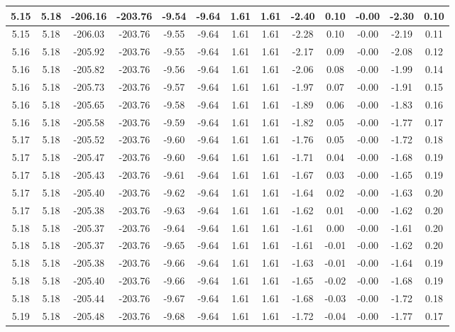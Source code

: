 \begin{table}[htbp]
\begin{adjustbox}{angle=90}
\begin{tabular}{|c|c|c|c|c|c|c|c|c|c|c|c|c|}
 5.15 & 5.18 & -206.16 & -203.76 & -9.54 & -9.64 & 1.61 & 1.61 & -2.40 & 0.10 & -0.00 & -2.30 & 0.10\\ \hline
 5.15 & 5.18 & -206.03 & -203.76 & -9.55 & -9.64 & 1.61 & 1.61 & -2.28 & 0.10 & -0.00 & -2.19 & 0.11\\ \hline
 5.16 & 5.18 & -205.92 & -203.76 & -9.55 & -9.64 & 1.61 & 1.61 & -2.17 & 0.09 & -0.00 & -2.08 & 0.12\\ \hline
 5.16 & 5.18 & -205.82 & -203.76 & -9.56 & -9.64 & 1.61 & 1.61 & -2.06 & 0.08 & -0.00 & -1.99 & 0.14\\ \hline
 5.16 & 5.18 & -205.73 & -203.76 & -9.57 & -9.64 & 1.61 & 1.61 & -1.97 & 0.07 & -0.00 & -1.91 & 0.15\\ \hline
 5.16 & 5.18 & -205.65 & -203.76 & -9.58 & -9.64 & 1.61 & 1.61 & -1.89 & 0.06 & -0.00 & -1.83 & 0.16\\ \hline
 5.16 & 5.18 & -205.58 & -203.76 & -9.59 & -9.64 & 1.61 & 1.61 & -1.82 & 0.05 & -0.00 & -1.77 & 0.17\\ \hline
 5.17 & 5.18 & -205.52 & -203.76 & -9.60 & -9.64 & 1.61 & 1.61 & -1.76 & 0.05 & -0.00 & -1.72 & 0.18\\ \hline
 5.17 & 5.18 & -205.47 & -203.76 & -9.60 & -9.64 & 1.61 & 1.61 & -1.71 & 0.04 & -0.00 & -1.68 & 0.19\\ \hline
 5.17 & 5.18 & -205.43 & -203.76 & -9.61 & -9.64 & 1.61 & 1.61 & -1.67 & 0.03 & -0.00 & -1.65 & 0.19\\ \hline
 5.17 & 5.18 & -205.40 & -203.76 & -9.62 & -9.64 & 1.61 & 1.61 & -1.64 & 0.02 & -0.00 & -1.63 & 0.20\\ \hline
 5.17 & 5.18 & -205.38 & -203.76 & -9.63 & -9.64 & 1.61 & 1.61 & -1.62 & 0.01 & -0.00 & -1.62 & 0.20\\ \hline
 5.18 & 5.18 & -205.37 & -203.76 & -9.64 & -9.64 & 1.61 & 1.61 & -1.61 & 0.00 & -0.00 & -1.61 & 0.20\\ \hline
 5.18 & 5.18 & -205.37 & -203.76 & -9.65 & -9.64 & 1.61 & 1.61 & -1.61 & -0.01 & -0.00 & -1.62 & 0.20\\ \hline
 5.18 & 5.18 & -205.38 & -203.76 & -9.66 & -9.64 & 1.61 & 1.61 & -1.63 & -0.01 & -0.00 & -1.64 & 0.19\\ \hline
 5.18 & 5.18 & -205.40 & -203.76 & -9.66 & -9.64 & 1.61 & 1.61 & -1.65 & -0.02 & -0.00 & -1.68 & 0.19\\ \hline
 5.18 & 5.18 & -205.44 & -203.76 & -9.67 & -9.64 & 1.61 & 1.61 & -1.68 & -0.03 & -0.00 & -1.72 & 0.18\\ \hline
 5.19 & 5.18 & -205.48 & -203.76 & -9.68 & -9.64 & 1.61 & 1.61 & -1.72 & -0.04 & -0.00 & -1.77 & 0.17\\ \hline

\end{tabular}
\end{adjustbox}
\end{table}
